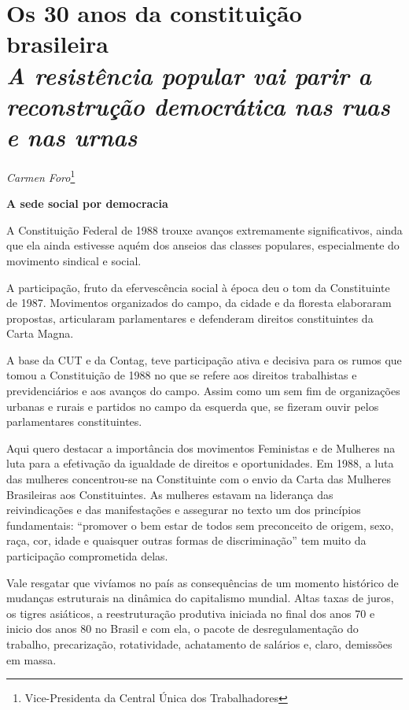 \chapter{Os 30 anos da constituição brasileira\\
\emph{A resistência popular vai parir a reconstrução democrática nas
ruas e nas urnas}}

\begin{flushright}
\emph{Carmen Foro}\footnote{Vice-Presidenta da Central Única dos Trabalhadores}
\end{flushright}

\textbf{A sede social por democracia}

A Constituição Federal de 1988 trouxe avanços extremamente
significativos, ainda que ela ainda estivesse aquém dos anseios das
classes populares, especialmente do movimento sindical e social.

A participação, fruto da efervescência social à época deu o tom da
Constituinte de 1987. Movimentos organizados do campo, da cidade e da
floresta elaboraram propostas, articularam parlamentares e defenderam
direitos constituintes da Carta Magna.

A base da CUT e da Contag, teve participação ativa e decisiva para os
rumos que tomou a Constituição de 1988 no que se refere aos direitos
trabalhistas e previdenciários e aos avanços do campo. Assim como um sem
fim de organizações urbanas e rurais e partidos no campo da esquerda
que, se fizeram ouvir pelos parlamentares constituintes.

Aqui quero destacar a importância dos movimentos Feministas e de
Mulheres na luta para a efetivação da igualdade de direitos e
oportunidades. Em 1988, a luta das mulheres concentrou-se na
Constituinte com o envio da Carta das Mulheres Brasileiras aos
Constituintes. As mulheres estavam na liderança das reivindicações e das
manifestações e assegurar no texto um dos princípios fundamentais:
``promover o bem estar de todos sem preconceito de origem, sexo, raça,
cor, idade e quaisquer outras formas de discriminação'' tem muito da
participação comprometida delas.

Vale resgatar que vivíamos no país as consequências de um momento
histórico de mudanças estruturais na dinâmica do capitalismo mundial.
Altas taxas de juros, os tigres asiáticos, a reestruturação produtiva
iniciada no final dos anos 70 e inicio dos anos 80 no Brasil e com ela,
o pacote de desregulamentação do trabalho, precarização, rotatividade,
achatamento de salários e, claro, demissões em massa.

